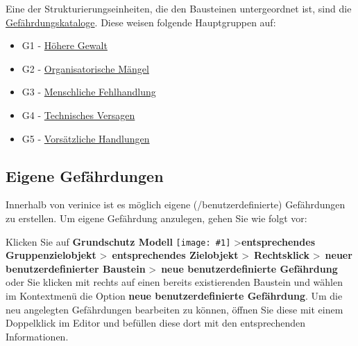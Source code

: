 \documentclass[a4paper,10pt]{book}
\newcommand{\icon}[1]{\texttt{[image: \#1]}}
\begin{document}
Eine der Strukturierungseinheiten, die den Bausteinen untergeordnet ist, sind die \href{https://www.bsi.bund.de/cln_156/DE/Themen/weitereThemen/ITGrundschutzKataloge/Inhalt/Gefaehrdungskataloge/gefaehrdungskataloge_node.html}{Gefährdungskataloge}. Diese weisen folgende Hauptgruppen auf:
\begin{itemize}
\item G1 - \href{https://www.bsi.bund.de/cln_156/DE/Themen/weitereThemen/ITGrundschutzKataloge/Inhalt/Gefaehrdungskataloge/G1HoehereGewalt/g1hoeheregewalt_node.html}{Höhere Gewalt}
\item G2 - \href{https://www.bsi.bund.de/cln_156/DE/Themen/weitereThemen/ITGrundschutzKataloge/Inhalt/Gefaehrdungskataloge/G2OrganisatorischeMaengel/g2organisatorischemaengel_node.html}{Organisatorische Mängel}
\item G3 - \href{https://www.bsi.bund.de/cln_156/DE/Themen/weitereThemen/ITGrundschutzKataloge/Inhalt/Gefaehrdungskataloge/G3MenschlicheFehlhandlung/g3menschlichefehlhandlung_node.html}{Menschliche Fehlhandlung}
\item G4 - \href{https://www.bsi.bund.de/cln_156/DE/Themen/weitereThemen/ITGrundschutzKataloge/Inhalt/Gefaehrdungskataloge/G4TechnischesVersagen/g4technischesversagen_node.html}{Technisches Versagen}
\item G5 - \href{https://www.bsi.bund.de/cln_156/DE/Themen/weitereThemen/ITGrundschutzKataloge/Inhalt/Gefaehrdungskataloge/G5VorsaetzlicheHandlungen/g5vorsaetzlichehandlungen_node.html}{Vorsätzliche Handlungen}
\end{itemize}

\subsection{Eigene Gefährdungen}
\label{sec_eigene_gefaehrdung}
Innerhalb von verinice ist es möglich eigene (/benutzerdefinierte) Gefährdungen zu erstellen. Um eigene Gefährdung anzulegen, gehen Sie wie folgt vor:

Klicken Sie auf \textbf{Grundschutz Modell} \icon{Icon/GS_Modell.png} \textgreater \textbf{entsprechendes Gruppenzielobjekt}
\textgreater\ \textbf{entsprechendes Zielobjekt} \textgreater\ \textbf{Rechtsklick} \textgreater\ \textbf{neuer benutzerdefinierter Baustein} \textgreater\
\textbf{neue benutzerdefinierte Gefährdung} oder Sie klicken mit rechts auf einen bereits existierenden Baustein und wählen im Kontextmenü
die Option \textbf{neue benutzerdefinierte Gefährdung}.
Um die neu angelegten Gefährdungen bearbeiten zu können, öffnen Sie diese mit einem Doppelklick im Editor und befüllen diese dort mit den entsprechenden
Informationen.
\end{document}
